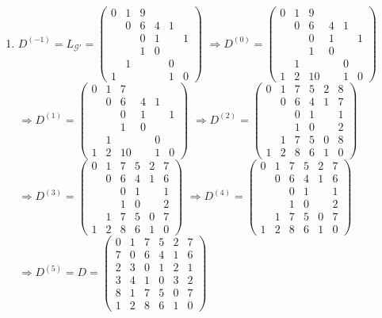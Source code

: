 \documentclass[a4paper,11pt]{article}             %
\begin{document}
\begin{enumerate}
\item %
$D^{(-1)} = L_\mathcal{G'} =
\begin{pmatrix}
0&1&9& & & \\
 &0&6&4&1& \\
 & &0&1& &1\\
 & &1&0& & \\
 &1& & &0& \\
1& & & &1&0
\end{pmatrix}$
$\Rightarrow
D^{(0)} = 
\begin{pmatrix}
0&1&9& & & \\
 &0&6&4&1& \\
 & &0&1& &1\\
 & &1&0& & \\
 &1& & &0& \\
1&2&10& &1&0
\end{pmatrix}$\\[1ex]
$\Rightarrow
D^{(1)} = 
\begin{pmatrix}
0&1&7& & & \\
 &0&6&4&1& \\
 & &0&1& &1\\
 & &1&0& & \\
 &1& & &0& \\
1&2&10& &1&0
\end{pmatrix}$
$\Rightarrow
D^{(2)} = 
\begin{pmatrix}
0&1&7&5&2&8\\
 &0&6&4&1&7\\
 & &0&1& &1\\
 & &1&0& &2\\
 &1&7&5&0&8\\
1&2&8&6&1&0
\end{pmatrix}$\\[1ex]
$\Rightarrow
D^{(3)} = 
\begin{pmatrix}
0&1&7&5&2&7\\
 &0&6&4&1&6\\
 & &0&1& &1\\
 & &1&0& &2\\
 &1&7&5&0&7\\
1&2&8&6&1&0
\end{pmatrix}$
$\Rightarrow
D^{(4)} = 
\begin{pmatrix}
0&1&7&5&2&7\\
 &0&6&4&1&6\\
 & &0&1& &1\\
 & &1&0& &2\\
 &1&7&5&0&7\\
1&2&8&6&1&0
\end{pmatrix}$\\[1ex]
$\Rightarrow
D^{(5)} = D =
\begin{pmatrix}
0&1&7&5&2&7\\
7&0&6&4&1&6\\
2&3&0&1&2&1\\
3&4&1&0&3&2\\
8&1&7&5&0&7\\
1&2&8&6&1&0
\end{pmatrix}$
\end{enumerate} %
\end{document}
